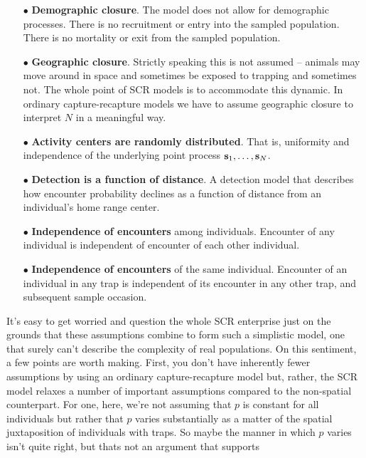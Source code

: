 \begin{itemize}
\item[$\bullet$] {\bf Demographic closure}. The model does not allow
  for demographic processes.  There is no recruitment or entry into
  the sampled population. There is no mortality or exit from the
  sampled population.
\item[$\bullet$] {\bf Geographic closure}.  Strictly speaking this is
  not assumed -- animals may move around in space and sometimes be
  exposed to trapping and sometimes not. The whole point of SCR models
  is to accommodate this dynamic. In ordinary capture-recapture models
  we have to assume geographic closure to interpret $N$ in a
  meaningful way.
\item[$\bullet$] {\bf Activity centers are randomly distributed}. That
  is, uniformity and independence of the underlying point process
  ${\bf s}_{1},\ldots, {\bf s}_{N}$.
\item[$\bullet$] {\bf Detection is a function of distance}.  A
  detection model that describes how
  encounter probability declines as a function of distance from an
  individual's home range center.
\item[$\bullet$] {\bf Independence of encounters} among
  individuals. Encounter of any individual is independent of encounter
  of each other individual.
\item[$\bullet$] {\bf Independence of encounters} of the same
  individual. Encounter of an individual in any trap is independent of
  its encounter in any other trap, and
  subsequent sample occasion.
\end{itemize}
It's easy to get worried and question the whole SCR enterprise just
on the grounds that these assumptions combine to form such a simplistic model, one
that surely can't describe the complexity of real populations.  On
this sentiment, a few points are worth making. First, you don't
have inherently fewer assumptions by using an ordinary
capture-recapture model but, rather, the SCR model relaxes a number of
important assumptions compared to the non-spatial counterpart.  For
one, here, we're not assuming that $p$ is constant for all individuals
but rather that $p$ varies substantially as a matter of the spatial
juxtaposition of individuals with traps. So maybe the manner in which
$p$ varies isn't quite right, but thats not an argument that supports
